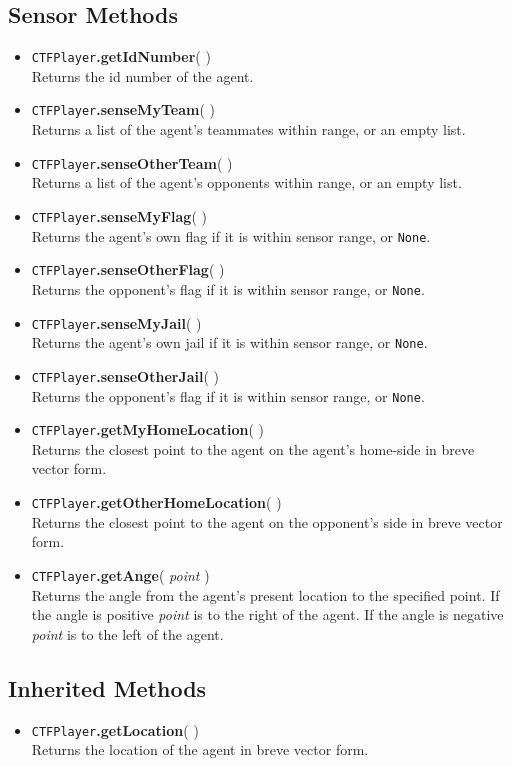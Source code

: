 \documentclass{article}
\begin{document}
\subsection*{Sensor Methods}
	\begin{itemize}
		\item\verb|CTFPlayer|\textbf{.getIdNumber}( )\\
		Returns the id number of the agent.
		\item\verb|CTFPlayer|\textbf{.senseMyTeam}( )\\
		Returns a list of the agent's teammates within range, or an empty list.
		\item\verb|CTFPlayer|\textbf{.senseOtherTeam}( )\\
		Returns a list of the agent's opponents within range, or an empty list.
		\item\verb|CTFPlayer|\textbf{.senseMyFlag}( )\\
		Returns the agent's own flag if it is within sensor range, or \verb|None|.
		\item\verb|CTFPlayer|\textbf{.senseOtherFlag}( )\\
		Returns the opponent's flag if it is within sensor range, or \verb|None|.
		\item\verb|CTFPlayer|\textbf{.senseMyJail}( )\\
		Returns the agent's own jail if it is within sensor range, or \verb|None|.
		\item\verb|CTFPlayer|\textbf{.senseOtherJail}( )\\
		Returns the opponent's flag if it is within sensor range, or \verb|None|.
		\item\verb|CTFPlayer|\textbf{.getMyHomeLocation}( )\\
		Returns the closest point to the agent on the agent's home-side in breve vector form.
		\item\verb|CTFPlayer|\textbf{.getOtherHomeLocation}( )\\
		Returns the closest point to the agent on the opponent's side in breve vector form.
		\item\verb|CTFPlayer|\textbf{.getAnge}( \emph{point} )\\
		Returns the angle from the agent's present location to the specified point. If the angle is positive \emph{point} is to the right of the agent. If the angle is negative \emph{point} is to the left of the agent.
	\end{itemize}
\subsection*{Inherited Methods}
	\begin{itemize}
		\item\verb|CTFPlayer|\textbf{.getLocation}( )\\
		Returns the location of the agent in breve vector form.
	\end{itemize}
\end{document}
